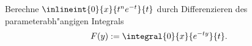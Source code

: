 \begin{prob}
Berechne $\inlineint{0}{x}{t^ne^{-t}}{t}$ durch Differenzieren des parameterabh"angigen Integrals
$$F(y):=\integral{0}{x}{e^{-ty}}{t}.$$
\end{prob}
